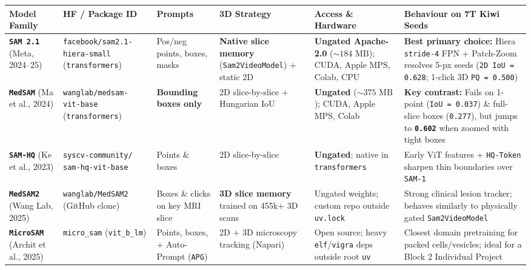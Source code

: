 \documentclass[10.5pt,a4paper]{article}
\begin{document}
\begin{table}[H]
\centering
\scriptsize
\renewcommand{\arraystretch}{1.22}
\begin{tabularx}{\textwidth}{L{2.0cm} L{2.7cm} L{2.3cm} L{2.3cm} L{2.6cm} Y}
\toprule
{}
\textbf{Model Family} & \textbf{HF / Package ID} & \textbf{Prompts} & \textbf{3D Strategy} & \textbf{Access \& Hardware} & \textbf{Behaviour on 7T Kiwi Seeds} \\
\midrule
\textbf{\texttt{SAM 2.1}} \newline (Meta, 2024--25) & \texttt{facebook/sam2.1-} \texttt{hiera-small} \newline (\texttt{transformers}) & Pos/neg points, boxes, masks & \textbf{Native slice memory} (\texttt{Sam2VideoModel}) + static 2D & \textbf{Ungated Apache-2.0} ($\sim 184\text{ MB}$); CUDA, Apple MPS, Colab, CPU & \textbf{Best primary choice:} Hiera \texttt{stride-4} FPN + Patch-Zoom resolves 5-px seeds (\texttt{2D IoU = 0.628}; 1-click 3D \texttt{PQ = 0.500}) \\
\textbf{\texttt{MedSAM}} \newline (Ma et al., 2024) & \texttt{wanglab/medsam-} \texttt{vit-base} \newline (\texttt{transformers}) & \textbf{Bounding boxes only} & 2D slice-by-slice + Hungarian IoU & \textbf{Ungated} ($\sim 375\text{ MB}$); CUDA, Apple MPS, Colab & \textbf{Key contrast:} Fails on 1-point (\texttt{IoU = 0.037}) \& full-slice boxes (\texttt{0.277}), but jumps to \textbf{\texttt{0.602}} when zoomed with tight boxes \\
\textbf{\texttt{SAM-HQ}} \newline (Ke et al., 2023) & \texttt{syscv-community/} \texttt{sam-hq-vit-base} & Points \& boxes & 2D slice-by-slice & \textbf{Ungated}; native in \texttt{transformers} & Early ViT features + \texttt{HQ-Token} sharpen thin boundaries over \texttt{SAM-1} \\
\textbf{\texttt{MedSAM2}} \newline (Wang Lab, 2025) & \texttt{wanglab/MedSAM2} \newline (GitHub clone) & Boxes \& clicks on key MRI slice & \textbf{3D slice memory} trained on 455k+ 3D scans & Ungated weights; custom repo outside \texttt{uv.lock} & Strong clinical lesion tracker; behaves similarly to physically gated \texttt{Sam2VideoModel} \\
\textbf{\texttt{MicroSAM}} \newline (Archit et al., 2025) & \texttt{micro\_sam} \newline (\texttt{vit\_b\_lm}) & Points, boxes, + Auto-Prompt (\texttt{APG}) & 2D + 3D microscopy tracking (Napari) & Open source; heavy \texttt{elf}/\texttt{vigra} deps outside root \texttt{uv} & Closest domain pretraining for packed cells/vesicles; ideal for a Block 2 Individual Project \\

\end{tabularx}
\end{table}
\end{document}
